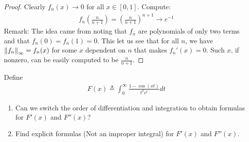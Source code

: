 \documentclass{report}
\begin{document}
\begin{proof}
Clearly $f_n(x) \rightarrow 0$ for all $x\in [0,1]$. Compute: 
\begin{align*}
f_n \left( \frac{n}{n+1} \right) = \left(\frac{n}{n+1}   \right)^{n+1} \rightarrow  e^{-1}
\end{align*}
Remark: The idea came from noting that $f_n$ are polynomials of only two terms and that $f_n(0)=f_n(1)=0$. This let us see that for all $n$,  we have $\left\| f_n \right\|_{\infty}=f_n(x)$ for some $x$  dependent on $n$ that makes  $f_n'(x)=0$. Such $x$, if nonzero, can be easily computed to be  $\frac{n}{n+1}$.  
\end{proof}
\begin{question}{}{}
Define 
\begin{align*}
F(x)\triangleq \int_0^{\infty} \frac{1-\cos (xt)}{t^2e^t}dt
\end{align*}
\begin{enumerate}[label=(\roman*)]
  \item Can we switch the order of differentiation and integration to obtain formulas for $F'(x)$ and $F''(x)$? 
  \item Find explicit formulas (Not an improper integral) for $F'(x)$ and $F''(x)$.  
\end{enumerate}
\end{question}
\end{document}
